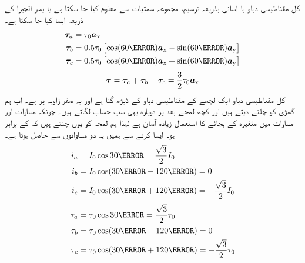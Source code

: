 کل مقناطیسی دباو با آسانی بذریعہ ترسیم،  مجموعہ سمتیات سے  معلوم کیا جا سکتا ہے یا پھر الجبرا کے ذریعہ ایسا کیا جا سکتا ہے۔
\begin{gather}
\begin{aligned}
\kvec{\tau}_a&=\tau_0 \ax\\
\kvec{\tau}_b&=0.5 \tau_0 \left[\cos (60\degree) \ax-\sin (60\degree)\ay \right]\\
\kvec{\tau}_c&=0.5 \tau_0 \left[\cos (60\degree) \ax+\sin (60\degree)\ay \right]
\end{aligned}
\end{gather}
%
\begin{align}
{\ensuremath{{\boldsymbol{\tau}}}}={{\boldsymbol{\tau}}}_a+{{\boldsymbol{\tau}}}_b+{{\boldsymbol{\tau}}}_c=\frac{3}{2} \tau_0 {\boldsymbol{a}}_{\textup{x}}
\end{align}
کل مقناطیسی دباو ایک لچھے کے مقناطیسی دباو کے ڈیڑھ گنا ہے اور یہ صفر زاویہ پر ہے۔ اب ہم گھڑی کو چلنے دیتے ہیں اور کچھ لمحے بعد  پر دوبارہ یہی سب حساب لگاتے ہیں۔ چونکہ مساوات   اور مساوات   میں متغیرہ  کے بجائے  کا استعمال زیادہ آسان ہے لہٰذا ہم لمحہ  کو یوں چنتے ہیں کہ   کے برابر ہو۔ ایسا کرنے سے ہمیں یہ دو مساواتوں سے حاصل ہوتا ہے۔
\begin{gather}
\begin{aligned}
i_a&=I_0 \cos 30\degree=\frac{\sqrt{3}}{2} I_0\\
i_b&=I_0 \cos (30\degree-120\degree)=0\\
i_c&=I_0 \cos (30\degree+120\degree)=-\frac{\sqrt{3}}{2} I_0
\end{aligned}
\end{gather}
%
\begin{gather}
\begin{aligned}
\tau_a&=\tau_0 \cos 30\degree=\frac{\sqrt{3}}{2} \tau_0\\
\tau_b&=\tau_0 \cos (30\degree-120\degree)=0\\
\tau_c&=\tau_0 \cos (30\degree+120\degree)=-\frac{\sqrt{3}}{2} \tau_0
\end{aligned}
\end{gather}
%
